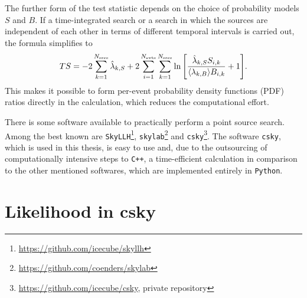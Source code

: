 The further form of the test statistic depends on the choice of probability models $S$ and $B$.
If a time-integrated search or a search in which the sources are independent of each other in terms of different temporal intervals is carried out, the formula simplifies to
\begin{equation}
    TS = -2\sum_{k=1}^{N_{\text{srcs}}}\hat\lambda_{k,S} + 2\sum_{i=1}^{N_{\text{evts}}}\sum_{k=1}^{N_{\text{srcs}}}\ln{\left[ \frac{\hat\lambda_{k,S}S_{i,k}}{\langle\lambda_{k,B}\rangle B_{i,k}}+1 \right]}.
\end{equation}
This makes it possible to form per-event probability density functions (PDF) ratios directly in the calculation, which reduces the computational effort.

There is some software available to practically perform a point source search.
Among the best known are \texttt{SkyLLH}\footnote{\url{https://github.com/icecube/skyllh}}, \texttt{skylab}\footnote{\url{https://github.com/coenders/skylab}} and \texttt{csky}\footnote{\url{https://github.com/icecube/csky}, private repository}.
The software \texttt{csky}, which is used in this thesis, is easy to use and, due to the outsourcing of computationally intensive steps to \texttt{C++}, a time-efficient calculation in comparison to the other mentioned softwares, which are implemented entirely in \texttt{Python}.

\section{Likelihood in csky}

